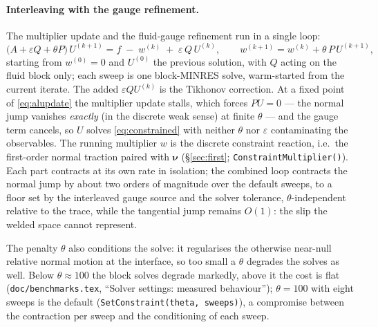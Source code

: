 \documentclass[11pt]{article}
\newcommand{\eps}{\varepsilon}
\newcommand{\bnu}{\bm{\nu}}
\begin{document}
\paragraph{Interleaving with the gauge refinement.} The multiplier
update and the fluid-gauge refinement run in a single loop:
\begin{equation}
  \bigl( A + \eps Q + \theta P \bigr)\, U^{(k+1)}
     = f \;-\; w^{(k)} \;+\; \eps\, Q\, U^{(k)} ,
  \qquad
  w^{(k+1)} = w^{(k)} + \theta\, P\, U^{(k+1)} ,
  \label{eq:alupdate}
\end{equation}
starting from $w^{(0)} = 0$ and $U^{(0)}$ the previous solution, with
$Q$ acting on the fluid block only; each sweep is one block-MINRES solve,
warm-started from the current iterate. The added $\eps QU^{(k)}$ is the
Tikhonov correction. At a fixed point of \eqref{eq:alupdate} the
multiplier update stalls, which forces $P U = 0$ --- the normal jump
vanishes \emph{exactly} (in the discrete weak sense) at finite
$\theta$ --- and the gauge term cancels, so $U$ solves
\eqref{eq:constrained} with neither $\theta$ nor $\eps$ contaminating
the observables. The running multiplier $w$ is the discrete constraint
reaction, i.e.\ the first-order normal traction paired with $\bnu$
(\S\ref{sec:first}; \texttt{ConstraintMultiplier()}). Each part
contracts at its own rate in isolation; the combined loop contracts the
normal jump by about two orders of magnitude over the default sweeps,
to a floor set by the interleaved gauge source and the solver
tolerance, $\theta$-independent relative to the trace, while the
tangential jump remains $O(1)$: the slip the welded space cannot
represent.

The penalty $\theta$ also conditions the solve: it regularises the
otherwise near-null relative normal motion at the interface, so too
small a $\theta$ degrades the solves as well. Below $\theta \approx 100$
the block solves degrade markedly, above it the cost is flat
(\texttt{doc/benchmarks.tex}, ``Solver settings: measured behaviour'');
$\theta = 100$ with eight sweeps is the default
(\texttt{SetConstraint(theta, sweeps)}), a compromise between the
contraction per sweep and the conditioning of each sweep.
\end{document}
